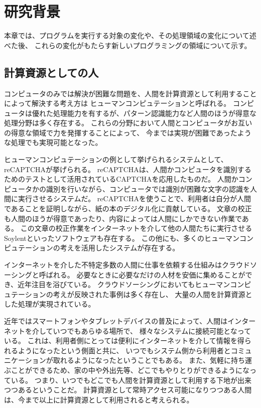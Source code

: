 \chapter{研究背景}\label{chap:background}

本章では、プログラムを実行する対象の変化や、その処理領域の変化について述べた後、
これらの変化がもたらす新しいプログラミングの領域について示す。

\newpage

\section{計算資源としての人}\label{sec:human-as-computational-resouces}

コンピュータのみでは解決が困難な問題を、人間を計算資源として利用することによって解決する考え方は
ヒューマンコンピュテーション\cite{humancomputation}と呼ばれる。
コンピュータは優れた処理能力を有するが、パターン認識能力など人間のほうが得意な処理分野は多く存在する。
これらの分野において人間とコンピュータがお互いの得意な領域で力を発揮することによって、
今までは実現が困難であったような処理でも実現可能となった。

ヒューマンコンピュテーションの例として挙げられるシステムとして、reCAPTCHA\cite{recaptcha}が挙げられる。
reCAPTCHAは、人間かコンピュータを識別するためのテストとして活用されているCAPTCHA\cite{captcha}を応用したものだ。
人間かコンピュータかの識別を行いながら、コンピュータでは識別が困難な文字の認識を人間に実行させるシステムだ。
reCAPTCHAを使うことで、利用者は自分が人間であることを証明しながら、紙の本のデジタル化に貢献している。
文章の校正も人間のほうが得意であったり、内容によっては人間にしかできない作業である。
この文章の校正作業をインターネットを介して他の人間たちに実行させるSoylent\cite{soylent}といったソフトウェアも存在する。
この他にも、多くのヒューマンコンピュテーションの考えを活用したシステムが存在する。

インターネットを介した不特定多数の人間に仕事を依頼する仕組みはクラウドソーシング\cite{riseofcrowdsourcing}と呼ばれる。
必要なときに必要なだけの人材を安価に集めることができ、近年注目を浴びている。
クラウドソーシングにおいてもヒューマンコンピュテーションの考えが反映された事例は多く存在し、
大量の人間を計算資源とした処理が実現されている。

近年ではスマートフォンやタブレットデバイスの普及によって、人間はインターネットを介していつでもあらゆる場所で、
様々なシステムに接続可能となっている。
これは、利用者側にとっては便利にインターネットを介して情報を得られるようになったという側面と共に、
いつでもシステム側から利用者とコミュニケーションが取れるようになったということでもある。
また、気軽に持ち運ぶことができるため、家の中や外出先等、どこでもやりとりができるようになっている。
つまり、いつでもどこでも人間を計算資源として利用する下地が出来つつあるということだ。
計算資源として常時アクセス可能になりつつある人間は、今まで以上に計算資源として利用されると考えられる。


